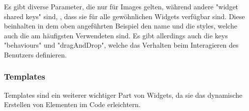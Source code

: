 Es gibt diverse Parameter, die nur für Images gelten, während andere "widget shared keys" sind, \dah, dass sie für alle gewöhnlichen Widgets verfügbar sind.
Diese beinhalten in dem oben angeführten Beispiel den name und die styles, welche auch die am häufigsten Verwendeten sind.
Es gibt allerdings auch die keys "behaviours" und "dragAndDrop", welche das Verhalten beim Interagieren des Benutzers definieren.


\subsubsection{Templates}\label{sec:templates}
Templates sind ein weiterer wichtiger Part von Widgets, da sie das dynamische Erstellen von Elementen im Code erleichtern.
